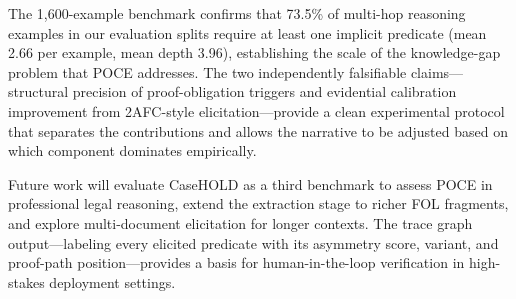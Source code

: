 \documentclass[11pt,letterpaper]{article}
\begin{document}
The 1,600-example benchmark confirms that 73.5\% of multi-hop reasoning examples in our evaluation splits require at least
one implicit predicate (mean 2.66 per example, mean depth 3.96), establishing the scale of the knowledge-gap problem that
POCE addresses. The two independently falsifiable claims---structural precision of proof-obligation triggers and evidential
calibration improvement from 2AFC-style elicitation---provide a clean experimental protocol that separates the contributions
and allows the narrative to be adjusted based on which component dominates empirically.

Future work will evaluate CaseHOLD \citep{Zheng2021} as a third benchmark to assess POCE in professional legal reasoning, extend the extraction stage to richer FOL fragments,
and explore multi-document elicitation for longer contexts. The trace graph output---labeling every elicited predicate with
its asymmetry score, variant, and proof-path position---provides a basis for human-in-the-loop verification in high-stakes
deployment settings.



\end{document}
